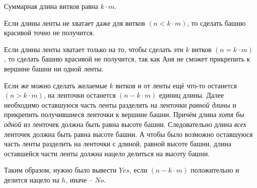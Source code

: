 \solutionSection

Суммарная длина витков равна $k \cdot m$.

Если длины ленты не хватает даже для витков $(n < k \cdot m)$, то сделать башню красивой точно не получится.

Если длины ленты хватает только на то, чтобы сделать эти $k$ витков $(n = k \cdot m)$, то сделать башню красивой не получится, так как Аня не сможет прикрепить к вершине башни ни одной ленты.

Если же можно сделать желаемые $k$ витков и от ленты ещё что-то останется $(n > k \cdot m)$, на ленточки останется $(n - k \cdot m)$ единиц длины. Далее необходимо оставшуюся часть ленты разделить на ленточки \emph{равной длины} и прикрепить получившиеся ленточки к вершине башни. Причём длина \emph{хотя бы одной} из ленточек должна быть равна высоте башни. Следовательно длина \emph{всех} ленточек должна быть равна высоте башни. А чтобы было возможно оставшуюся часть ленты разделить на ленточки с длиной, равной высоте башни, длина оставшейся части ленты должна нацело делиться на высоту башни.

Таким образом, нужно было вывести $Yes$, если $(n - k \cdot m)$ положительно и делится нацело на $h$, иначе -- $No$.

\codeExample


